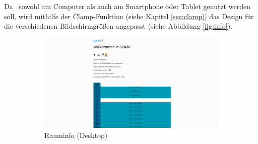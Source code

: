 
\clearpage
{}

Da \ZELIA\ sowohl am Computer als auch am Smartphone oder Tablet genutzt werden soll, wird mithilfe der Clamp-Funktion (siehe Kapitel \ref{sec:clamp}) das Design für die verschiedenen Bildschirmgrößen angepasst (siehe Abbildung \ref{fig:info}).

\begin{figure}[H]
    \begin{subfigure}[c]{0.64\textwidth}
        \centering
        \includegraphics[width=\textwidth]{media/ResponsiveDesign/ZeliaDesktop.png}
        \caption{Rauminfo (Desktop)}
    \end{subfigure} \hfill
    \begin{subfigure}[c]{0.34\textwidth}
        \centering

\end{subfigure}
\end{figure}
